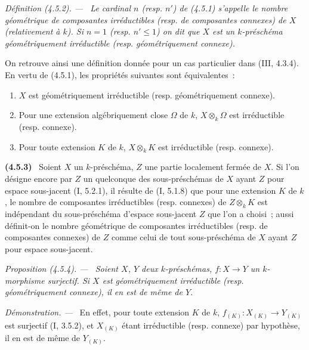 \documentclass[10pt,oneside]{book}
\newcommand{\oldpage}[2][]{%
  \setcounter{footnote}{0}%
  \marginpar{\scriptsize\textbf{#1}~|~#2}\ignorespaces}
\newenvironment{env}[1][]{\par\medskip\noindent\textbf{(#1)}\ }{\par}
\newenvironment{definition}[1][]{%
  \par\medskip\noindent\itshape Définition (#1). ---\ }{\par}
\newenvironment{proposition}[1][]{%
  \par\medskip\noindent\itshape Proposition (#1). ---\ }{\par}
\newenvironment{proof}{%
  \par\medskip\noindent\textit{Démonstration. ---\ }}{\par}
\begin{document}
\begin{definition}[4.5.2]
\label{IV.2.4.5.2-fr}
Le cardinal $n$ (resp. $n'$) de (4.5.1) s'appelle le \emph{nombre géométrique
de composantes irréductibles} (resp. \emph{de composantes connexes}) de $X$
(relativement à $k$). Si $n=1$ (resp. $n'\leqslant1$) on dit que $X$ est un
$k$-préschéma \emph{géométriquement irréductible} (resp. \emph{géométriquement
connexe}).
\end{definition}

On retrouve ainsi une définition donnée pour un cas particulier dans
(III, 4.3.4). En vertu de (4.5.1), les propriétés suivantes sont
équivalentes~:
\begin{enumerate}
\item[$a)$] $X$ est géométriquement irréductible (resp. géométriquement
connexe).
\item[$b)$] Pour une extension algébriquement close $\Omega$ de $k$,
$X\otimes_k\Omega$ est irréductible (resp. connexe).
\item[$c)$] Pour toute extension $K$ de $k$, $X\otimes_k K$ est irréductible
(resp. connexe).
\end{enumerate}

\begin{env}[4.5.3]
\label{IV.2.4.5.3-fr}
Soient $X$ un $k$-préschéma, $Z$ une partie localement fermée de $X$. Si l'on
désigne encore par $Z$ un quelconque des sous-préschémas de $X$ ayant $Z$ pour
espace sous-jacent (I, 5.2.1), il résulte de (I, 5.1.8) que pour une extension
$K$ de $k$, le nombre de composantes irréductibles (resp. connexes) de
$Z\otimes_k K$ est indépendant du sous-préschéma d'espace sous-jacent $Z$ que
l'on a choisi~; aussi définit-on le nombre géométrique de composantes
irréductibles (resp. de composantes connexes) de $Z$ comme celui de tout
sous-préschéma de $X$ ayant $Z$ pour espace sous-jacent.
\end{env}

\begin{proposition}[4.5.4]
\label{IV.2.4.5.4-fr}
Soient $X$, $Y$ deux $k$-préschémas, $f:X\to Y$ un $k$-morphisme surjectif.
Si $X$ est géométriquement irréductible (resp. géométriquement connexe), il en
est de même de $Y$.
\end{proposition}

\oldpage[IV-2]{62}

\begin{proof}
En effet, pour toute extension $K$ de $k$, $f_{(K)}:X_{(K)}\to Y_{(K)}$ est
surjectif (I, 3.5.2), et $X_{(K)}$ étant irréductible (resp. connexe) par
hypothèse, il en est de même de $Y_{(K)}$.
\end{proof}
\end{document}
